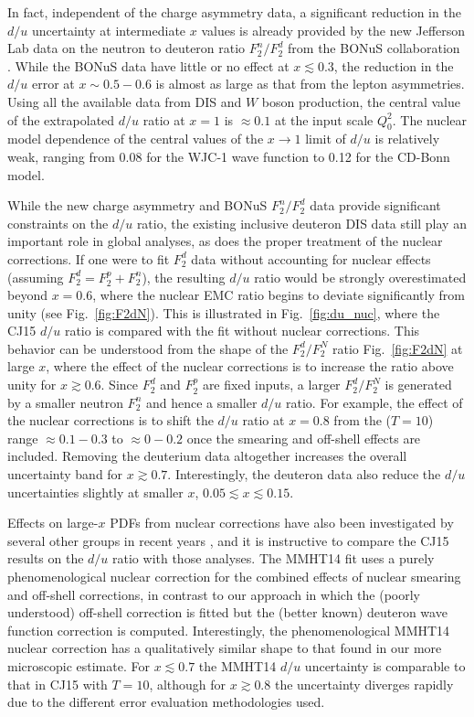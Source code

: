 \documentclass[aps,prd,amsmath,preprint]{revtex4}
\begin{document}
In fact, independent of the charge asymmetry data, a significant
reduction in the $d/u$ uncertainty at intermediate $x$ values is
already provided by the new Jefferson Lab data on the neutron to
deuteron ratio $F_2^n/F_2^d$ from the BONuS collaboration
\cite{BONuS}.  While the BONuS data have little or no effect
at $x \lesssim 0.3$, the reduction in the $d/u$ error at
$x \sim 0.5-0.6$ is almost as large as that from the lepton
asymmetries.
Using all the available data from DIS and $W$ boson production,
the central value of the extrapolated $d/u$ ratio at $x=1$
is $\approx 0.1$ at the input scale $Q_0^2$.
The nuclear model dependence of the central values of the
$x \to 1$ limit of $d/u$ is relatively weak, ranging from 0.08
for the WJC-1 wave function to 0.12 for the CD-Bonn model.


While the new charge asymmetry and BONuS $F_2^n/F_2^d$ data
provide significant constraints on the $d/u$ ratio, the existing
inclusive deuteron DIS data still play an important role in global
analyses, as does the proper treatment of the nuclear corrections.
If one were to fit $F_2^d$ data without accounting for nuclear
effects (assuming $F_2^d = F_2^p + F_2^n$), the resulting $d/u$
ratio would be strongly overestimated beyond $x = 0.6$, where the
nuclear EMC ratio begins to deviate significantly from unity
(see Fig.~\ref{fig:F2dN}).  This is illustrated in
Fig.~\ref{fig:du_nuc}, where the CJ15 $d/u$ ratio is compared
with the fit without nuclear corrections.
This behavior can be understood from the shape of the $F_2^d/F_2^N$
ratio Fig.~\ref{fig:F2dN} at large $x$, where the effect of the
nuclear corrections is to increase the ratio above unity for
$x \gtrsim 0.6$.  Since $F_2^d$ and $F_2^p$ are fixed inputs,
a larger $F_2^d/F_2^N$ is generated by a smaller neutron $F_2^n$
and hence a smaller $d/u$ ratio.  For example, the effect of the
nuclear corrections is to shift the $d/u$ ratio at $x = 0.8$
from the ($T=10$) range $\approx 0.1 - 0.3$ to $\approx 0 - 0.2$
once the smearing and off-shell effects are included.
%
Removing the deuterium data altogether increases the overall
uncertainty band for $x \gtrsim 0.7$.  Interestingly, the deuteron
data also reduce the $d/u$ uncertainties slightly at smaller $x$,
$0.05 \lesssim x \lesssim 0.15$.


Effects on large-$x$ PDFs from nuclear corrections have also been
investigated by several other groups in recent years \cite{ABKM09, 
ABM11, MMSTWW13, MMHT14, NNPDF13, JR14}, and it is instructive to
compare the CJ15 results on the $d/u$ ratio with those analyses.
The MMHT14 fit \cite{MMHT14} uses a purely phenomenological nuclear
correction for the combined effects of nuclear smearing and
off-shell corrections, in contrast to our approach in which the
(poorly understood) off-shell correction is fitted but the
(better known) deuteron wave function correction is computed.
Interestingly, the phenomenological MMHT14 nuclear correction
has a qualitatively similar shape to that found in our more
microscopic estimate.  For $x \lesssim 0.7$ the MMHT14 $d/u$
uncertainty is comparable to that in CJ15 with $T=10$, although
for $x \gtrsim 0.8$ the uncertainty diverges rapidly due to the
different error evaluation methodologies used.
\end{document}
